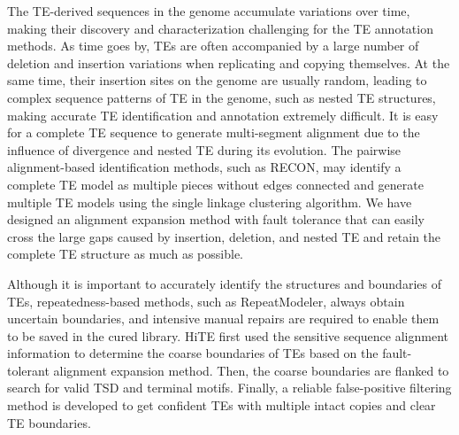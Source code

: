 \documentclass{bmcart}
\begin{document}
The TE-derived sequences in the genome accumulate variations over time, making their discovery and characterization challenging for the TE annotation methods. As time goes by, TEs are often accompanied by a large number of deletion and insertion variations when replicating and copying themselves. At the same time, their insertion sites on the genome are usually random, leading to complex sequence patterns of TE in the genome, such as nested TE structures, making accurate TE identification and annotation extremely difficult. It is easy for a complete TE sequence to generate multi-segment alignment due to the influence of divergence and nested TE during its evolution. The pairwise alignment-based identification methods, such as RECON, may identify a complete TE model as multiple pieces without edges connected and generate multiple TE models using the single linkage clustering algorithm. We have designed an alignment expansion method with fault tolerance that can easily cross the large gaps caused by insertion, deletion, and nested TE and retain the complete TE structure as much as possible.

Although it is important to accurately identify the structures and boundaries of TEs, repeatedness-based methods, such as RepeatModeler\cite{Smit2008repeatmodeler}, always obtain uncertain boundaries, and intensive manual repairs are required to enable them to be saved in the cured library\cite{storer2022methodologies}. HiTE first used the sensitive sequence alignment information to determine the coarse boundaries of TEs based on the fault-tolerant alignment expansion method. Then, the coarse boundaries are flanked to search for valid TSD and terminal motifs. Finally, a reliable false-positive filtering method is developed to get confident TEs with multiple intact copies and clear TE boundaries.
\end{document}
